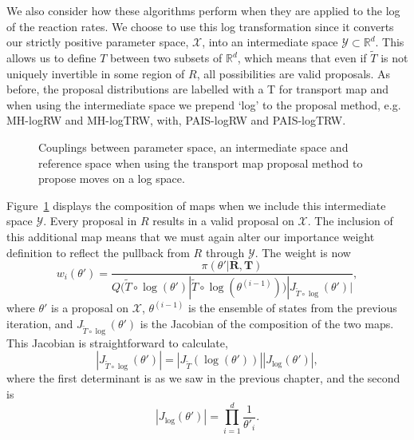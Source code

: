\documentclass[final]{siamltex}
\newcommand\irregularcircle[2]{%
  \pgfextra {\pgfmathsetmacro\len{(#1)+rand*(#2)}}
  +(0:\len pt)
  \foreach \a in {10,20,...,350}{
    \pgfextra {\pgfmathsetmacro\len{(#1)+rand*(#2)}}
    -- +(\a:\len pt)
  } -- cycle
}
\begin{document}
We also consider how these algorithms perform when they are applied to the log of the reaction rates. We choose to use this log transformation since it converts our strictly positive parameter space, $\mathcal{X}$, into an intermediate space $\mathcal{Y} \subset \mathbb{R}^d$. This allows us to define $T$ between two subsets of $\mathbb{R}^d$, which means that even if $\tilde{T}$ is not uniquely invertible in some region of $R$, all possibilities are valid proposals. As before, the proposal distributions are labelled with a T for transport map and when using the intermediate space we prepend `log' to the proposal method, e.g. MH-logRW and MH-logTRW, with, PAIS-logRW and PAIS-logTRW.

\begin{figure}
	\centering
	\caption{Couplings between parameter space, an intermediate space and reference space when using the transport map proposal method to propose moves on a log space.}
	\label{fig:chem_log_coupling}
\end{figure}

Figure~\ref{fig:chem_log_coupling} displays the composition of maps when we include this intermediate space $\mathcal{Y}$. Every proposal in $R$ results in a valid proposal on $\mathcal{X}$. The inclusion of this additional map means that we must again alter our importance weight definition to reflect the pullback from $R$ through $\mathcal{Y}$. The weight is now
\[
	w_i(\theta') = \frac{\pi(\theta'|\mathbf{R},\mathbf{T})}{Q(\tilde{T}\circ\log(\theta')|\tilde{T}\circ\log(\theta^{(i-1)}))|J_{\tilde{T}\circ\log}(\theta')|},
\]
where $\theta'$ is a proposal on $\mathcal{X}$, $\theta^{(i-1)}$ is the ensemble of states from the previous iteration, and $J_{\tilde{T}\circ\log}(\theta')$ is the Jacobian of the composition of the two maps. This Jacobian is straightforward to calculate,
\[
	|J_{\tilde{T}\circ\log}(\theta')| = |J_{\tilde{T}}(\log(\theta'))||J_{\log}(\theta')|,
\]
where the first determinant is as we saw in the previous chapter, and the second is
\[
	|J_{\log}(\theta')| = \prod\limits_{i=1}^d \frac{1}{\theta'_i}.
\]
\end{document}
